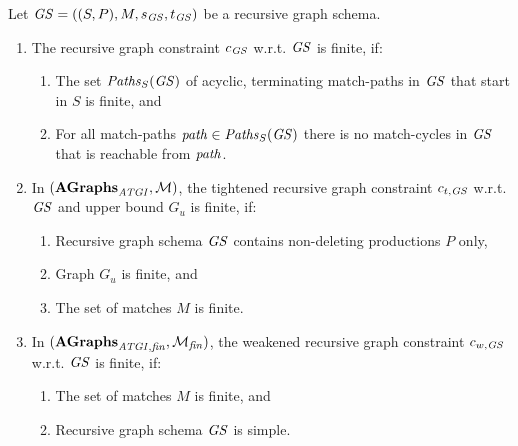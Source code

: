 \begin{theorem}
\label{thm:sec-compl-software-trans:fin_rec_gc}
Let $\mathit{GS}=((S,P),M,s_\mathit{GS},t_\mathit{GS})$ be a recursive graph schema.
\begin{enumerate}
  \item The recursive graph constraint $c_\mathit{GS}$ w.r.t. $\mathit{GS}$ is finite, if:
  \begin{enumerate}
    \item \label{thm:sec-compl-software-trans:fin_rec_gc:1}The set $\mathit{Paths}_S(\mathit{GS})$ of acyclic, terminating match-paths in $\mathit{GS}$ that start in $S$ is finite, and 
    \item \label{thm:sec-compl-software-trans:fin_rec_gc:2}For all match-paths $\mathit{path} \in \mathit{Paths}_S(\mathit{GS})$ there is no match-cycles in $\mathit{GS}$ that is reachable from $\mathit{path}$.
  \end{enumerate}
  \item In $(\mathbf{AGraphs}_\mathit{ATGI},{\cal M})$, the tightened recursive graph constraint $c_{t,\mathit{GS}}$ w.r.t. $\mathit{GS}$ and upper bound $G_u$ is finite, if:
  \begin{enumerate}
    \item \label{thm:sec-compl-software-trans:fin_rec_gc:5}Recursive graph schema $\mathit{GS}$ contains non-deleting productions $P$ only,
    \item \label{thm:sec-compl-software-trans:fin_rec_gc:3}Graph $G_u$ is finite, and
    \item \label{thm:sec-compl-software-trans:fin_rec_gc:4}The set of matches $M$ is finite.
  \end{enumerate}
  \item In $(\mathbf{AGraphs}_{\mathit{ATGI},\mathit{fin}},{\cal M}_\mathit{fin})$, the weakened recursive graph constraint $c_{w,\mathit{GS}}$ w.r.t. $\mathit{GS}$ is finite, if:
  \begin{enumerate}
    \item \label{thm:sec-compl-software-trans:fin_rec_gc:6}The set of matches $M$ is finite, and
    \item \label{thm:sec-compl-software-trans:fin_rec_gc:7}Recursive graph schema $\mathit{GS}$ is simple.
    \envEndMarker
  \end{enumerate}
\end{enumerate}
\end{theorem}

